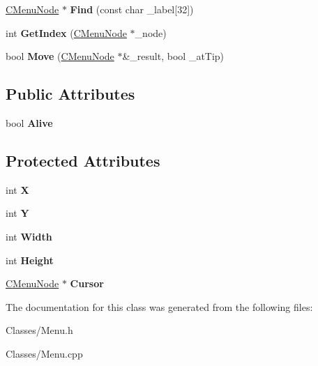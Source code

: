\begin{DoxyCompactItemize}
\item 
\hyperlink{class_c_menu_node}{C\+Menu\+Node} $\ast$ {\bfseries Find} (const char \+\_\+label\mbox{[}32\mbox{]})\hypertarget{class_c_menu_a7df4a60ce0c2654f92c770c500f33576}{}\label{class_c_menu_a7df4a60ce0c2654f92c770c500f33576}

\item 
int {\bfseries Get\+Index} (\hyperlink{class_c_menu_node}{C\+Menu\+Node} $\ast$\+\_\+node)\hypertarget{class_c_menu_a4eae259ca5876075f4502a7138e22de0}{}\label{class_c_menu_a4eae259ca5876075f4502a7138e22de0}

\item 
bool {\bfseries Move} (\hyperlink{class_c_menu_node}{C\+Menu\+Node} $\ast$\&\+\_\+result, bool \+\_\+at\+Tip)\hypertarget{class_c_menu_a54d76f69aeb7b5c24213f294538b85a7}{}\label{class_c_menu_a54d76f69aeb7b5c24213f294538b85a7}

\end{DoxyCompactItemize}
\subsection*{Public Attributes}
\begin{DoxyCompactItemize}
\item 
bool {\bfseries Alive}\hypertarget{class_c_menu_a8ee14e0a0d7bdddd70a60388d1535578}{}\label{class_c_menu_a8ee14e0a0d7bdddd70a60388d1535578}

\end{DoxyCompactItemize}
\subsection*{Protected Attributes}
\begin{DoxyCompactItemize}
\item 
int {\bfseries X}\hypertarget{class_c_menu_ac8a6e07179118de0d2d0559c818fde01}{}\label{class_c_menu_ac8a6e07179118de0d2d0559c818fde01}

\item 
int {\bfseries Y}\hypertarget{class_c_menu_aa21585a21f674ffe6b74c11769784248}{}\label{class_c_menu_aa21585a21f674ffe6b74c11769784248}

\item 
int {\bfseries Width}\hypertarget{class_c_menu_a46e5a8e40fdeb225658b306481345684}{}\label{class_c_menu_a46e5a8e40fdeb225658b306481345684}

\item 
int {\bfseries Height}\hypertarget{class_c_menu_ab23bc5592efa0860e90ac60b8c115a38}{}\label{class_c_menu_ab23bc5592efa0860e90ac60b8c115a38}

\item 
\hyperlink{class_c_menu_node}{C\+Menu\+Node} $\ast$ {\bfseries Cursor}\hypertarget{class_c_menu_a6bd7b1f8e6838465c15d1985986f29fe}{}\label{class_c_menu_a6bd7b1f8e6838465c15d1985986f29fe}

\end{DoxyCompactItemize}


The documentation for this class was generated from the following files\+:\begin{DoxyCompactItemize}
\item 
Classes/Menu.\+h\item 
Classes/Menu.\+cpp\end{DoxyCompactItemize}
